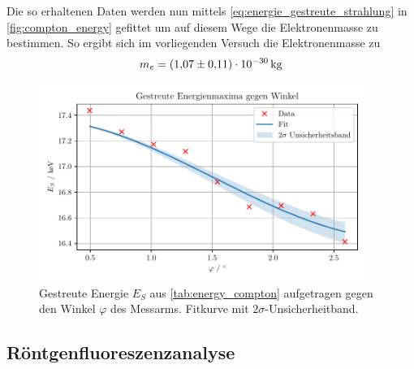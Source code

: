\documentclass[ngerman]{scrartcl}
\begin{document}
%
Die so erhaltenen Daten werden nun mittels \autoref{eq:energie_gestreute_strahlung} in \autoref{fig:compton_energy} gefittet um auf diesem Wege die Elektronenmasse zu bestimmen. So ergibt sich im vorliegenden Versuch die Elektronenmasse zu
\[m_e = \SI{1.07(11)E-30}{\kilogram}\]
%
\begin{figure}[H]
    \centering
    \begin{samepage}
        \includegraphics[width=0.95\textwidth]{../plots/energie_winkel.pdf}
        \caption[Gestreute Energie $E_S$ gegen Winkel $\varphi$]{Gestreute Energie $E_S$ aus \autoref{tab:energy_compton} aufgetragen gegen den Winkel $\varphi$ des Messarms. Fitkurve mit $2\sigma$-Unsicherheitband.}
        \label{fig:compton_energy}
    \end{samepage}
\end{figure}


\subsection{Röntgenfluoreszenzanalyse}
\label{subsec:auswertung_fluoreszenz}
\end{document}
